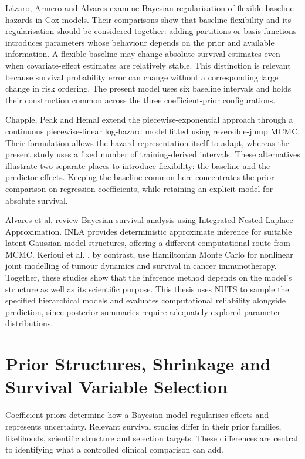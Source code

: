 Lázaro, Armero and Alvares \cite{ref23} examine Bayesian regularisation of flexible baseline hazards in Cox models. Their comparisons show that baseline flexibility and its regularisation should be considered together: adding partitions or basis functions introduces parameters whose behaviour depends on the prior and available information. A flexible baseline may change absolute survival estimates even when covariate-effect estimates are relatively stable. This distinction is relevant because survival probability error can change without a corresponding large change in risk ordering. The present model uses six baseline intervals and holds their construction common across the three coefficient-prior configurations.

Chapple, Peak and Hemal \cite{ref91} extend the piecewise-exponential approach through a continuous piecewise-linear log-hazard model fitted using reversible-jump MCMC. Their formulation allows the hazard representation itself to adapt, whereas the present study uses a fixed number of training-derived intervals. These alternatives illustrate two separate places to introduce flexibility: the baseline and the predictor effects. Keeping the baseline common here concentrates the prior comparison on regression coefficients, while retaining an explicit model for absolute survival.

Alvares et al. \cite{ref90} review Bayesian survival analysis using Integrated Nested Laplace Approximation. INLA provides deterministic approximate inference for suitable latent Gaussian model structures, offering a different computational route from MCMC. Kerioui et al. \cite{ref58}, by contrast, use Hamiltonian Monte Carlo for nonlinear joint modelling of tumour dynamics and survival in cancer immunotherapy. Together, these studies show that the inference method depends on the model's structure as well as its scientific purpose. This thesis uses NUTS to sample the specified hierarchical models and evaluates computational reliability alongside prediction, since posterior summaries require adequately explored parameter distributions.

\section{Prior Structures, Shrinkage and Survival Variable Selection}\label{prior-structures-shrinkage-and-survival-variable-selection}

Coefficient priors determine how a Bayesian model regularises effects and represents uncertainty. Relevant survival studies differ in their prior families, likelihoods, scientific structure and selection targets. These differences are central to identifying what a controlled clinical comparison can add.

